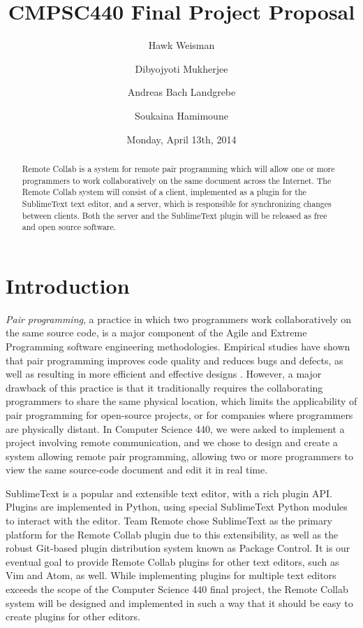 \documentclass[11pt,english]{article}
\date{Monday, April 13th, 2014}
\title{CMPSC440 Final Project Proposal}
\author[1]{Hawk Weisman}
\author[1]{Dibyojyoti Mukherjee}
\author[1]{Andreas Bach Landgrebe}
\author[2]{Soukaina Hamimoune}
\affil[1]{Allegheny College, Department of Computer Science}
\affil[2]{Al Akhawayn University, Department of Computer Science}
\begin{document}
\maketitle
	\begin{abstract}
	Remote Collab is a system for remote pair programming which will allow one or more programmers to work collaboratively on the same document across the Internet. The Remote Collab system will consist of a client, implemented as a plugin for the SublimeText text editor, and a server, which is responsible for synchronizing changes between clients. Both the server and the SublimeText plugin will be released as free and open source software.
	\end{abstract}

\section{Introduction}
	\label{sec:intro}
	\textit{Pair programming}, a practice in which two programmers work collaboratively on the same source code, is a major component of the Agile and Extreme Programming software engineering methodologies. Empirical studies have shown that pair programming improves code quality and reduces bugs and defects, as well as resulting in more efficient and effective designs \cite{cockburn2000costs}. However, a major drawback of this practice is that it traditionally requires the collaborating programmers to share the same physical location, which limits the applicability of pair programming for open-source projects, or for companies where programmers are physically distant. In Computer Science 440, we were asked to implement a project involving remote communication, and we chose to design and create a system allowing remote pair programming, allowing two or more programmers to view the same source-code document and edit it in real time.

	SublimeText is a popular and extensible text editor, with a rich plugin API. Plugins are implemented in Python, using special SublimeText Python modules to interact with the editor. Team Remote chose SublimeText as the primary platform for the Remote Collab plugin due to this extensibility, as well as the robust Git-based plugin distribution system known as Package Control. It is our eventual goal to provide Remote Collab plugins for other text editors, such as Vim and Atom, as well. While implementing plugins for multiple text editors exceeds the scope of the Computer Science 440 final project, the Remote Collab system will be designed and implemented in such a way that it should be easy to create plugins for other editors.
\end{document}
